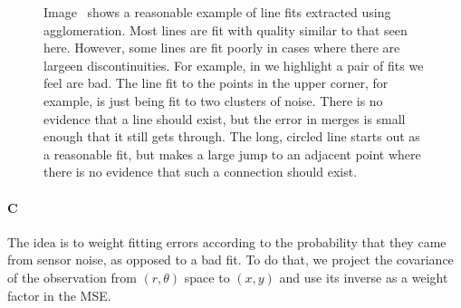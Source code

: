 \documentclass[12pt]{article}
\begin{document}
\begin{figure}[h!]
\centering
{}
\caption{Image~ shows a reasonable example of line fits
    extracted using agglomeration. Most lines are fit with quality similar to that
    seen here. However, some lines are fit poorly in cases where there are largeen
    discontinuities. For example, in  we highlight a pair
    of fits we feel are bad. The line fit to the points in the upper corner, for
    example, is just being fit to two clusters of noise. There is no evidence
    that a line should exist, but the error in merges is small enough that it
    still gets through. The long, circled line starts out as a reasonable fit, but
    makes a large jump to an adjacent point where there is no evidence that such a
    connection should exist.
}
\label{fig:line_fits}
\end{figure}

\paragraph{C}
The idea is to weight fitting errors according to the probability that they came from sensor noise, as opposed to a bad fit. To do that, we project the covariance of the observation from $(r,\theta)$ space to $(x,y)$ and use its inverse as a weight factor in the MSE.
\end{document}
